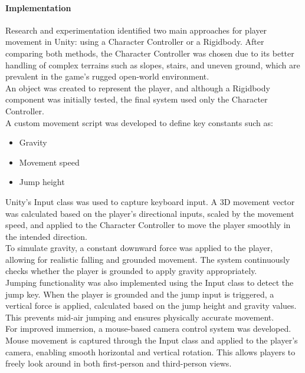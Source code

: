 \documentclass{article}
\begin{document}
\paragraph{Implementation}

Research and experimentation identified two main approaches for player movement in Unity: using a Character Controller or a Rigidbody. After comparing both methods, the Character Controller was chosen due to its better handling of complex terrains such as slopes, stairs, and uneven ground, which are prevalent in the game's rugged open-world environment.\\

An object was created to represent the player, and although a Rigidbody component was initially tested, the final system used only the Character Controller.\\

A custom movement script was developed to define key constants such as:
\begin{itemize}
    \item Gravity
    \item Movement speed
    \item Jump height
\end{itemize}

Unity's Input class was used to capture keyboard input. A 3D movement vector was calculated based on the player's directional inputs, scaled by the movement speed, and applied to the Character Controller to move the player smoothly in the intended direction.\\

To simulate gravity, a constant downward force was applied to the player, allowing for realistic falling and grounded movement. The system continuously checks whether the player is grounded to apply gravity appropriately.\\

Jumping functionality was also implemented using the Input class to detect the jump key. When the player is grounded and the jump input is triggered, a vertical force is applied, calculated based on the jump height and gravity values. This prevents mid-air jumping and ensures physically accurate movement.\\

For improved immersion, a mouse-based camera control system was developed. Mouse movement is captured through the Input class and applied to the player's camera, enabling smooth horizontal and vertical rotation. This allows players to freely look around in both first-person and third-person views.
\end{document}
